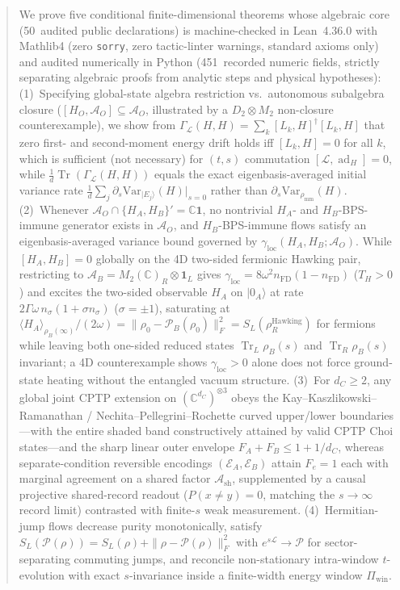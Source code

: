 \documentclass[11pt,a4paper]{article}
\theoremstyle{definition}
\theoremstyle{remark}
\newcommand{\Tr}{\operatorname{Tr}}
\newcommand{\ad}{\operatorname{ad}}
\newcommand{\cA}{\mathcal{A}}
\newcommand{\cL}{\mathcal{L}}
\newcommand{\cE}{\mathcal{E}}
\newcommand{\cP}{\mathcal{P}}
\newcommand{\bbC}{\mathbb{C}}
\newcommand{\1}{\mathbf{1}}
\newcommand{\normF}[1]{\|#1\|_F}
\begin{document}
\begin{abstract}
We prove five conditional finite-dimensional theorems whose algebraic core (50~audited public declarations) is machine-checked in Lean~4.36.0 with Mathlib4 (zero \texttt{sorry}, zero tactic-linter warnings, standard axioms only) and audited numerically in Python (451~recorded numeric fields, strictly separating algebraic proofs from analytic steps and physical hypotheses):
(1)~Specifying global-state algebra restriction vs.\ autonomous subalgebra closure ($[H_O,\cA_O]\subseteq\cA_O$, illustrated by a $D_2\otimes M_2$ non-closure counterexample), we show from $\Gamma_{\cL}(H,H) = \sum_k [L_k,H]^\dagger [L_k,H]$ that zero first- and second-moment energy drift holds iff $[L_k,H]=0$ for all $k$, which is sufficient (not necessary) for $(t,s)$ commutation $[\cL,\ad_H]=0$, while $\frac{1}{d}\Tr(\Gamma_{\cL}(H,H))$ equals the exact eigenbasis-averaged initial variance rate $\frac{1}{d}\sum_j \partial_s \mathrm{Var}_{|E_j\rangle}(H)|_{s=0}$ rather than $\partial_s\mathrm{Var}_{\rho_{\mathrm{mm}}}(H)$.
(2)~Whenever $\cA_O \cap \{H_A,H_B\}' = \bbC\1$, no nontrivial $H_A$- and $H_B$-BPS-immune generator exists in $\cA_O$, and $H_B$-BPS-immune flows satisfy an eigenbasis-averaged variance bound governed by $\gamma_{\mathrm{loc}}(H_A,H_B;\cA_O)$. While $[H_A,H_B]=0$ globally on the 4D two-sided fermionic Hawking pair, restricting to $\cA_B = M_2(\bbC)_R\otimes\1_L$ gives $\gamma_{\mathrm{loc}} = 8\omega^2 n_{\mathrm{FD}}(1-n_{\mathrm{FD}})$ ($T_H>0$) and excites the two-sided observable $H_A$ on $|0_A\rangle$ at rate $2\Gamma\omega\,n_\sigma(1+\sigma n_\sigma)$ ($\sigma=\pm 1$), saturating at $\langle H_A\rangle_{\rho_B(\infty)}/(2\omega) = \normF{\rho_0 - \cP_B(\rho_0)}^2 = S_L(\rho_R^{\mathrm{Hawking}})$ for fermions while leaving both one-sided reduced states $\Tr_L\rho_B(s)$ and $\Tr_R\rho_B(s)$ invariant; a 4D counterexample shows $\gamma_{\mathrm{loc}}>0$ alone does not force ground-state heating without the entangled vacuum structure.
(3)~For $d_C\ge 2$, any global joint CPTP extension on $(\bbC^{d_C})^{\otimes 3}$ obeys the Kay--Kaszlikowski--Ramanathan / Nechita--Pellegrini--Rochette curved upper/lower boundaries---with the entire shaded band constructively attained by valid CPTP Choi states---and the sharp linear outer envelope $F_A+F_B \le 1+1/d_C$, whereas separate-condition reversible encodings $(\cE_A,\cE_B)$ attain $F_e=1$ each with marginal agreement on a shared factor $\cA_{\mathrm{sh}}$, supplemented by a causal projective shared-record readout ($P(x\neq y)=0$, matching the $s\to\infty$ record limit) contrasted with finite-$s$ weak measurement.
(4)~Hermitian-jump flows decrease purity monotonically, satisfy $S_L(\cP(\rho)) = S_L(\rho)+\|\rho-\cP(\rho)\|_F^2$ with $e^{s\cL}\to\cP$ for sector-separating commuting jumps, and reconcile non-stationary intra-window $t$-evolution with exact $s$-invariance inside a finite-width energy window $\Pi_{\mathrm{win}}$.

\end{abstract}
\end{document}

